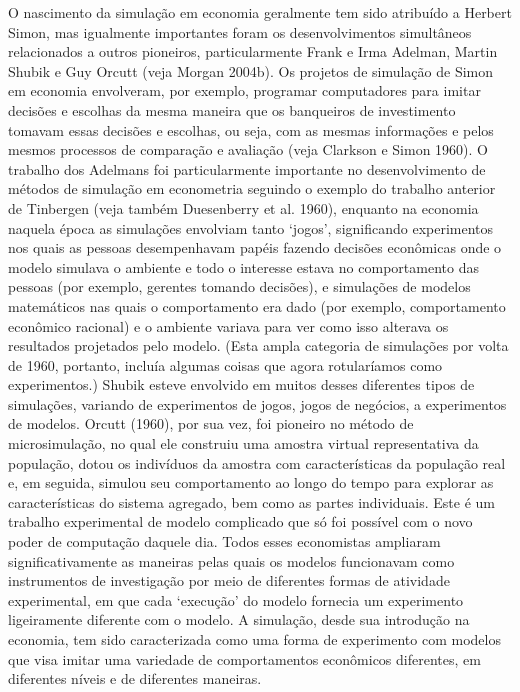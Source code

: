 \documentclass[a4paper,12pt]{article}[abntex2]
\begin{document}
O nascimento da simulação em economia geralmente tem sido atribuído a Herbert Simon, mas igualmente importantes foram os desenvolvimentos simultâneos relacionados a outros pioneiros, particularmente Frank e Irma Adelman, Martin Shubik e Guy Orcutt (veja Morgan 2004b). Os projetos de simulação de Simon em economia envolveram, por exemplo, programar computadores para imitar decisões e escolhas da mesma maneira que os banqueiros de investimento tomavam essas decisões e escolhas, ou seja, com as mesmas informações e pelos mesmos processos de comparação e avaliação (veja Clarkson e Simon 1960). O trabalho dos Adelmans foi particularmente importante no desenvolvimento de métodos de simulação em econometria seguindo o exemplo do trabalho anterior de Tinbergen (veja também Duesenberry et al. 1960), enquanto na economia naquela época as simulações envolviam tanto ‘jogos’, significando experimentos nos quais as pessoas desempenhavam papéis fazendo decisões econômicas onde o modelo simulava o ambiente e todo o interesse estava no comportamento das pessoas (por exemplo, gerentes tomando decisões), e simulações de modelos matemáticos nas quais o comportamento era dado (por exemplo, comportamento econômico racional) e o ambiente variava para ver como isso alterava os resultados projetados pelo modelo. (Esta ampla categoria de simulações por volta de 1960, portanto, incluía algumas coisas que agora rotularíamos como experimentos.) Shubik esteve envolvido em muitos desses diferentes tipos de simulações, variando de experimentos de jogos, jogos de negócios, a experimentos de modelos. Orcutt (1960), por sua vez, foi pioneiro no método de microsimulação, no qual ele construiu uma amostra virtual representativa da população, dotou os indivíduos da amostra com características da população real e, em seguida, simulou seu comportamento ao longo do tempo para explorar as características do sistema agregado, bem como as partes individuais. Este é um trabalho experimental de modelo complicado que só foi possível com o novo poder de computação daquele dia. Todos esses economistas ampliaram significativamente as maneiras pelas quais os modelos funcionavam como instrumentos de investigação por meio de diferentes formas de atividade experimental, em que cada ‘execução’ do modelo fornecia um experimento ligeiramente diferente com o modelo. A simulação, desde sua introdução na economia, tem sido caracterizada como uma forma de experimento com modelos que visa imitar uma variedade de comportamentos econômicos diferentes, em diferentes níveis e de diferentes maneiras.
\end{document}
